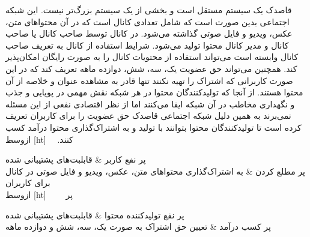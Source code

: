 ‫
‫
‫قاصدک یک سیستم مستقل است و بخشی از یک سیستم بزرگ‌تر نیست. این شبکه اجتماعی بدین صورت است که شامل تعدادی کانال است که در آن محتواهای متن، عکس، ویديو و فایل صوتی گذاشته می‌شود. در کانال توسط صاحب کانال یا صاحب کانال و مدیر کانال محتوا تولید می‌شود. شرایط استفاده از کانال به تعریف صاحب کانال وابسته است می‌تواند استفاده از محتویات کانال را به صورت رایگان امکان‌پذیر کند. همچنین می‌تواند حق عضویت یک، سه، شش، دوازده ماهه تعریف کند که در این صورت کاربرانی که اشتراک را تهیه نکنند تنها قادر به مشاهده عنوان و خلاصه از آن محتوا هستند. از آنجا که تولید‌کنندگان محتوا در هر شبکه نقش مهمی در پویایی و جذب و نگهداری مخاطب در آن شبکه ایفا می‌کنند اما از نظر اقتصادی نفعی از این مسئله نمی‌برند به همین دلیل شبکه اجتماعی قاصدک حق عضویت را برای کاربران تعریف کرده است تا تولیدکنندگان محتوا بتوانند با تولید و به اشتراک‌گذاری محتوا درآمد کسب کنند.
‫
‫
‫
‫[ht]
‫‌ازوسط

‫
‫‌پر 
‫ نفع کاربر &  قابلبت‌های پشتیبانی شده \\ 
‫‌پر
‫مطلع‌ کردن & به اشتراک‌گذاری محتواهای متن، عکس، ویديو و فایل صوتی در کانال برای کاربران\\ 

‫‌پر
‫
‫‫
‫
‫
‫
‫
‫[ht]
‫‌ازوسط

‫
‫‌پر 
‫ نفع تولید‌کننده محتوا &  قابلبت‌های پشتیبانی شده \\ 
‫‌پر
‫کسب در‌آمد & تعیین حق اشتراک به صورت یک، سه، شش و دوازده ماهه\\ 

